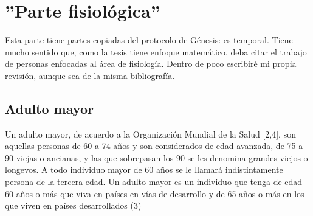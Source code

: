 \chapter{''Parte fisiol\'ogica''}

Esta parte tiene partes copiadas del protocolo de G\'enesis: es temporal. Tiene mucho sentido
que, como la tesis tiene enfoque matem\'atico, deba citar el trabajo de personas enfocadas al
\'area de fisiolog\'ia. Dentro de poco escribir\'e mi propia revisi\'on, aunque sea de la misma
bibliograf\'ia.

\section{Adulto mayor}

Un adulto mayor, de acuerdo a la Organización Mundial de la Salud [2,4], son aquellas personas de 60 a 74 años y son considerados de edad avanzada, de 75 a 90 viejas o ancianas, y las que sobrepasan los 90 se les denomina grandes viejos o longevos. A todo individuo mayor de 60 años se le llamará indistintamente persona de la tercera edad. Un adulto mayor es un individuo que tenga de edad 60 años o más que viva en países en vías de desarrollo y de 65 años o más en los que viven en países desarrollados (3) 


